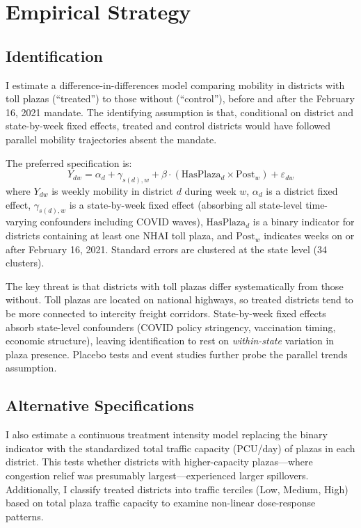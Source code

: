 \documentclass[12pt]{article}
\begin{document}
\section{Empirical Strategy}

\subsection{Identification}

I estimate a difference-in-differences model comparing mobility in districts with toll plazas (``treated'') to those without (``control''), before and after the February 16, 2021 mandate. The identifying assumption is that, conditional on district and state-by-week fixed effects, treated and control districts would have followed parallel mobility trajectories absent the mandate.

The preferred specification is:
\begin{equation}
Y_{dw} = \alpha_d + \gamma_{s(d),w} + \beta \cdot (\text{HasPlaza}_d \times \text{Post}_w) + \varepsilon_{dw}
\label{eq:did}
\end{equation}
where $Y_{dw}$ is weekly mobility in district $d$ during week $w$, $\alpha_d$ is a district fixed effect, $\gamma_{s(d),w}$ is a state-by-week fixed effect (absorbing all state-level time-varying confounders including COVID waves), $\text{HasPlaza}_d$ is a binary indicator for districts containing at least one NHAI toll plaza, and $\text{Post}_w$ indicates weeks on or after February 16, 2021. Standard errors are clustered at the state level (34 clusters).

The key threat is that districts with toll plazas differ systematically from those without. Toll plazas are located on national highways, so treated districts tend to be more connected to intercity freight corridors. State-by-week fixed effects absorb state-level confounders (COVID policy stringency, vaccination timing, economic structure), leaving identification to rest on \textit{within-state} variation in plaza presence. Placebo tests and event studies further probe the parallel trends assumption.

\subsection{Alternative Specifications}

I also estimate a continuous treatment intensity model replacing the binary indicator with the standardized total traffic capacity (PCU/day) of plazas in each district. This tests whether districts with higher-capacity plazas---where congestion relief was presumably largest---experienced larger spillovers. Additionally, I classify treated districts into traffic terciles (Low, Medium, High) based on total plaza traffic capacity to examine non-linear dose-response patterns.
\end{document}
